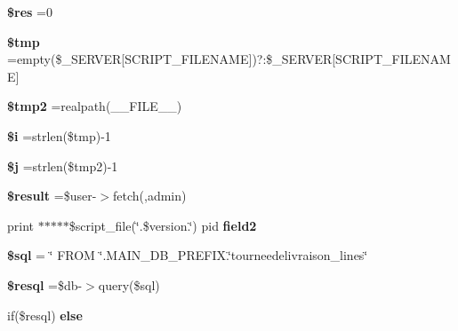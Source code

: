 \begin{DoxyCompactItemize}
\item 
\mbox{\label{tourneedelivraison__lines_8php_a49a8a4009b02e49717caa88b128affc5}} 
{\bfseries \$res} =0
\item 
\mbox{\label{tourneedelivraison__lines_8php_a57024d47cf8348153f5fdda16f8fefa9}} 
{\bfseries \$tmp} =empty(\$\+\_\+\+S\+E\+R\+V\+ER\mbox{[}\textquotesingle{}S\+C\+R\+I\+P\+T\+\_\+\+F\+I\+L\+E\+N\+A\+ME\textquotesingle{}\mbox{]})?\textquotesingle{}\textquotesingle{}\+:\$\+\_\+\+S\+E\+R\+V\+ER\mbox{[}\textquotesingle{}S\+C\+R\+I\+P\+T\+\_\+\+F\+I\+L\+E\+N\+A\+ME\textquotesingle{}\mbox{]}
\item 
\mbox{\label{tourneedelivraison__lines_8php_aed9bcb6730d1510376ce80e32bd9504d}} 
{\bfseries \$tmp2} =realpath(\+\_\+\+\_\+\+F\+I\+L\+E\+\_\+\+\_\+)
\item 
\mbox{\label{tourneedelivraison__lines_8php_a83018d9153d17d91fbcf3bc10158d34f}} 
{\bfseries \$i} =strlen(\$tmp)-\/1
\item 
\mbox{\label{tourneedelivraison__lines_8php_a6f16db779ef3ccea921b277b5dc245d1}} 
{\bfseries \$j} =strlen(\$tmp2)-\/1
\item 
\mbox{\label{tourneedelivraison__lines_8php_a112ef069ddc0454086e3d1e6d8d55d07}} 
{\bfseries \$result} =\$user-\/$>$fetch(\textquotesingle{}\textquotesingle{},\textquotesingle{}admin\textquotesingle{})
\item 
\mbox{\label{tourneedelivraison__lines_8php_af9edfce80596a171cfb2884ba7ad01df}} 
print $\ast$$\ast$$\ast$$\ast$$\ast$\$script\+\_\+file(\char`\"{}.\$version.\char`\"{}) pid {\bfseries field2}
\item 
\mbox{\label{tourneedelivraison__lines_8php_a047170d6020a882807665812a27e2525}} 
{\bfseries \$sql} = \char`\"{} F\+R\+OM \char`\"{}.M\+A\+I\+N\+\_\+\+D\+B\+\_\+\+P\+R\+E\+F\+I\+X.\char`\"{}tourneedelivraison\+\_\+lines\char`\"{}
\item 
\mbox{\label{tourneedelivraison__lines_8php_a6adc5ef389ab51c21dee69262018d615}} 
{\bfseries \$resql} =\$db-\/$>$query(\$sql)
\item 
if(\$resql) {\bfseries else}
\end{DoxyCompactItemize}


